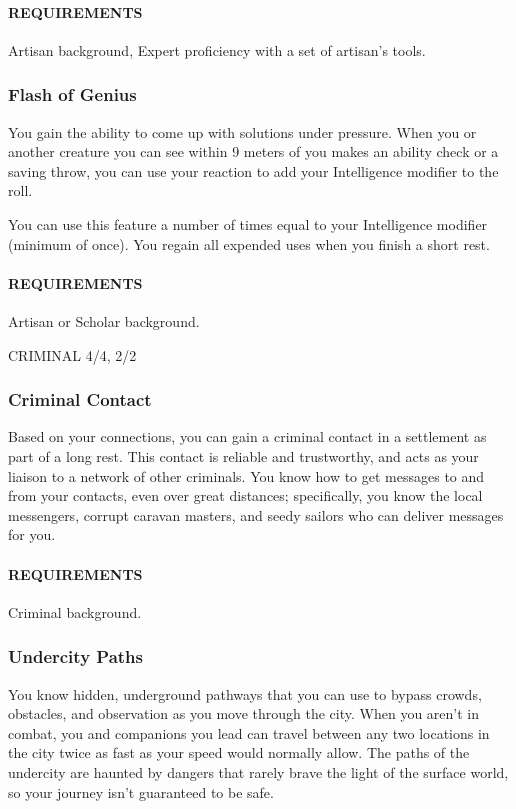         \paragraph{REQUIREMENTS} Artisan background, Expert proficiency with a set of artisan's tools.

    \subsubsection{Flash of Genius} \label{feat::flashofgenius}
        You gain the ability to come up with solutions under pressure.
        When you or another creature you can see within 9 meters of you makes an ability check or a saving throw, you can use your reaction to add your Intelligence modifier to the roll.

        You can use this feature a number of times equal to your Intelligence modifier (minimum of once).
        You regain all expended uses when you finish a short rest.
        \paragraph{REQUIREMENTS} Artisan or Scholar background.

CRIMINAL 4/4, 2/2
    \subsubsection{Criminal Contact} \label{feat::criminalcontact}
        Based on your connections, you can gain a criminal contact in a settlement as part of a long rest.
        This contact is reliable and trustworthy, and acts as your liaison to a network of other criminals.
        You know how to get messages to and from your contacts, even over great distances; specifically, you know the local messengers, corrupt caravan masters, and seedy sailors who can deliver messages for you.
        \paragraph{REQUIREMENTS} Criminal background.

    \subsubsection{Undercity Paths} \label{feat::undercitypaths}
        You know hidden, underground pathways that you can use to bypass crowds, obstacles, and observation as you move through the city.
        When you aren't in combat, you and companions you lead can travel between any two locations in the city twice as fast as your speed would normally allow.
        The paths of the undercity are haunted by dangers that rarely brave the light of the surface world, so your journey isn't guaranteed to be safe.
